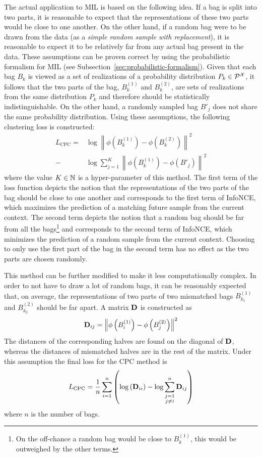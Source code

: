 The actual application to MIL is based on the following idea. If a bag is split into two parts, it is reasonable to expect that the representations of these two parts would be close to one another. On the other hand, if a random bag were to be drawn from the data (as a \textit{simple random sample with replacement}), it is reasonable to expect it to be relatively far from any actual bag present in the data. These assumptions can be proven correct by using the probabilistic formalism for MIL (see Subsection~\ref{sec:probabilistic-formalism}). Given that each bag \( B_k \) is viewed as a set of realizations of a probability distribution \( P_k \in \mathcal{P}^\mathspace{X} \), it follows that the two parts of the bag, \( B_k^{(1)} \) and \( B_k^{(2)} \), are sets of realizations from the same distribution \( P_k \) and therefore should be statistically indistinguishable. On the other hand, a randomly sampled bag \( B'_j \) does not share the same probability distribution.
Using these assumptions, the following clustering loss is constructed:
\begin{align*}
	L_\mathrm{CPC} = &\log \left\lVert \phi \left( B_k^{(1)} \right) - \phi \left( B_k^{(2)} \right) \right\rVert^2 \\
	- &\log \sum_{j = 1}^K \left\lVert \phi \left( B_k^{(1)} \right) - \phi \left( B'_j \right) \right\rVert^2
\end{align*}
where the value \( K \in \mathbb{N} \) is a hyper-parameter of this method. The first term of the loss function depicts the notion that the representations of the two parts of the bag should be close to one another and corresponds to the first term of InfoNCE, which maximizes the prediction of a matching future sample from the current context. The second term depicts the notion that a random bag should be far from all the bags\footnote{On the off-chance a random bag would be close to \( B_k^{(1)} \), this would be outweighed by the other terms.} and corresponds to the second term of InfoNCE, which minimizes the prediction of a random sample from the current context. Choosing to only use the first part of the bag in the second term has no effect as the two parts are chosen randomly.

This method can be further modified to make it less computationally complex. In order to not have to draw a lot of random bags, it can be reasonably expected that, on average, the representations of two parts of two mismatched bags \( B_{k_1}^{(1)} \) and \( B_{k_2}^{(2)} \) should be far apart. A matrix \( \mathbf{D} \) is constructed as
\begin{equation}\label{eq:bag-distance-matrix}
	\mathbf{D}_{ij} = \left\lVert \phi \left( B_i^{(1)} \right) - \phi \left( B_j^{(2)} \right) \right\rVert^2
\end{equation}
The distances of the corresponding halves are found on the diagonal of \( \mathbf{D} \), whereas the distances of mismatched halves are in the rest of the matrix. Under this assumption the final loss for the CPC method is
\[ L_\mathrm{CPC} = \frac{1}{n} \sum_{i = 1}^n \left( \log \left( \mathbf{D}_{ii} \right) - \log \sum_{\substack{j = 1 \\ j \neq i}}^n \mathbf{D}_{ij} \right) \]
where \( n \) is the number of bags.

